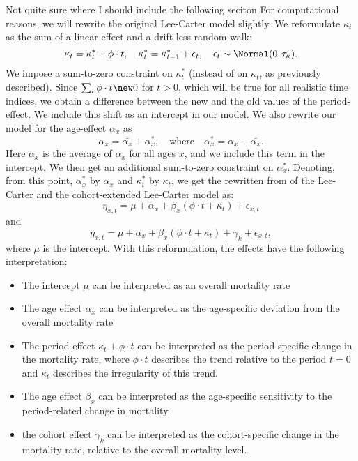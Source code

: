\textcolor{myDarkGreen}{Not quite sure where I should include the following seciton}
For computational reasons, we will rewrite the original Lee-Carter model slightly. We reformulate $\kappa_t$ as the sum of a linear effect and a drift-less random walk:
\begin{equation}
    \kappa_t = \kappa_t^* + \phi\cdot t, \quad \kappa_t^* = \kappa_{t-1}^* + \epsilon_t, \quad \epsilon_t \sim \Normal(0,\tau_{\kappa}).
\end{equation}
We impose a sum-to-zero constraint on $\kappa_t^*$ (instead of on $\kappa_t$, as previously described). Since $\sum_t \phi \cdot t \new 0$ for $t > 0$, which will be true for all realistic time indices, we obtain a difference between the new and the old values of the period-effect. We include this shift as an intercept in our model. We also rewrite our model for the age-effect $\alpha_x$ as 
\begin{equation}
    \alpha_x = \bar{\alpha_x} + \alpha_x^*, \quad \text{where} \quad \alpha_x^* = \alpha_x - \bar{\alpha_x}.
\end{equation}
Here $\bar{\alpha_x}$ is the average of $\alpha_x$ for all ages $x$, and we include this term in the intercept. We then get an additional sum-to-zero constraint on $\alpha_x^*$. Denoting, from this point, $\alpha_x^*$ by $\alpha_x$ and $\kappa_t^*$ by $\kappa_t$, we get the rewritten from of the Lee-Carter and the cohort-extended Lee-Carter model as:
\begin{equation}
    \eta_{x,t} = \mu + \alpha_x + \beta_x(\phi \cdot t + \kappa_t) + \epsilon_{x,t}
    \label{eq:LC-rewritten}
\end{equation}
and
\begin{equation}
    \eta_{x,t} = \mu + \alpha_x + \beta_x(\phi \cdot t + \kappa_t) + \gamma_k + \epsilon_{x,t},
    \label{eq:LCC-rewritten}
\end{equation}
where $\mu$ is the intercept. With this reformulation, the effects have the following interpretation:
\begin{itemize}
    \item The intercept $\mu$ can be interpreted as an overall mortality rate
    \item The age effect $\alpha_x$ can be interpreted as the age-specific deviation from the overall mortality rate
    \item The period effect $\kappa_t + \phi \cdot t$ can be interpreted as the period-specific change in the mortality rate, where $\phi \cdot t$ describes the trend relative to the period $t = 0$ and $\kappa_t$ describes the irregularity of this trend. 
    \item The age effect $\beta_x$ can be interpreted as the age-specific sensitivity to the period-related change in mortality. 
    \item the cohort effect $\gamma_k$ can be interpreted as the cohort-specific change in the mortality rate, relative to the overall mortality level. 
\end{itemize}

